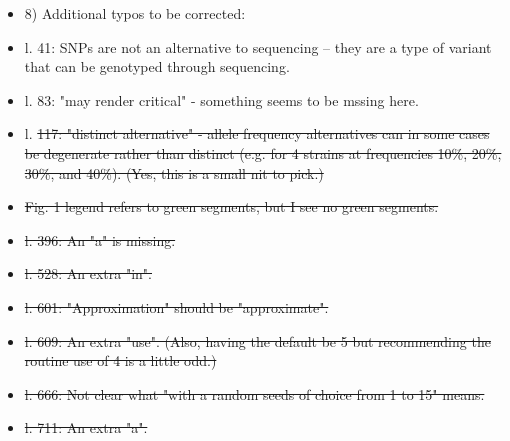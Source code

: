 \documentclass[11pt,twoside,a4paper]{article}
\begin{document}
\begin{itemize}
    \item 8) Additional typos to be corrected:

\item l. 41: SNPs are not an alternative to sequencing -- they are a type of variant that can be genotyped through sequencing.
\item l. 83: "may render critical" - something seems to be mssing here.
\item l. \st{117: "distinct alternative" - allele frequency alternatives can in some cases be degenerate rather than distinct (e.g. for 4 strains at frequencies 10\%, 20\%, 30\%, and 40\%). (Yes, this is a small nit to pick.)}
\item \st{Fig. 1 legend refers to green segments, but I see no green segments.}
\item \st{l. 396: An "a" is missing.}
\item \st{l. 528: An extra "in".}
\item \st{l. 601: "Approximation" should be "approximate". }
\item \st{l. 609: An extra "use". (Also, having the default be 5 but recommending the routine use of 4 is a little odd.)}
\item \st{l. 666: Not clear what "with a random seeds of choice from 1 to 15" means.}
\item \st{l. 711: An extra "a".}
\end{itemize}
\end{document}
